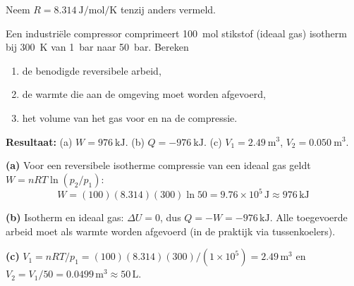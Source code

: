
Neem $R = \SI{8.314}{\joule\per\mole\per\kelvin}$ tenzij anders vermeld.

\begin{oefening}
Een industri\"ele compressor comprimeert \SI{100}{\mole} stikstof (ideaal gas) isotherm bij \SI{300}{\kelvin} van \SI{1}{\bar} naar \SI{50}{\bar}. Bereken
\begin{enumerate}
\item[(a)] de benodigde reversibele arbeid,
\item[(b)] de warmte die aan de omgeving moet worden afgevoerd,
\item[(c)] het volume van het gas voor en na de compressie.
\end{enumerate}
\end{oefening}
\begin{oplossing}
\textbf{Resultaat:} (a) $W = \SI{976}{\kilo\joule}$. (b) $Q = \SI{-976}{\kilo\joule}$. (c) $V_1 = \SI{2.49}{\metre\cubed}$, $V_2 = \SI{0.050}{\metre\cubed}$.

\textbf{(a)} Voor een reversibele isotherme compressie van een ideaal gas geldt $W = nRT\ln(p_2/p_1)$:
\[
W = (100)(8.314)(300)\ln 50 = 9.76\times 10^{5}\,\mathrm{J} \approx 976\,\mathrm{kJ}
\]

\textbf{(b)} Isotherm en ideaal gas: $\Delta U = 0$, dus $Q = -W = -976\,\mathrm{kJ}$. Alle toegevoerde arbeid moet als warmte worden afgevoerd (in de praktijk via tussenkoelers).

\textbf{(c)} $V_1 = nRT/p_1 = (100)(8.314)(300)/(1\times10^5) = 2.49\,\mathrm{m^3}$ en $V_2 = V_1/50 = 0.0499\,\mathrm{m^3} \approx 50\,\mathrm{L}$.
\end{oplossing}

